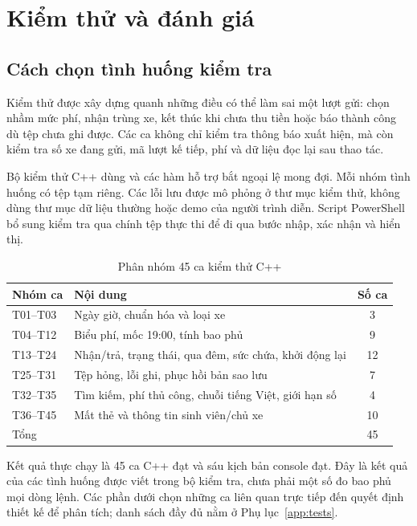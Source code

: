 \chapter{Kiểm thử và đánh giá}
\label{chap:evaluation}

\section{Cách chọn tình huống kiểm tra}
Kiểm thử được xây dựng quanh những điều có thể làm sai một lượt gửi: chọn nhầm mức phí, nhận trùng xe, kết thúc khi chưa thu tiền hoặc báo thành công dù tệp chưa ghi được. Các ca không chỉ kiểm tra thông báo xuất hiện, mà còn kiểm tra số xe đang gửi, mã lượt kế tiếp, phí và dữ liệu đọc lại sau thao tác.

Bộ kiểm thử C++ dùng  và các hàm hỗ trợ bắt ngoại lệ mong đợi. Mỗi nhóm tình huống có tệp tạm riêng. Các lỗi lưu được mô phỏng ở thư mục kiểm thử, không dùng thư mục dữ liệu thường hoặc demo của người trình diễn. Script PowerShell bổ sung kiểm tra qua chính tệp thực thi để đi qua bước nhập, xác nhận và hiển thị.

\begin{table}[H]
\centering\small
\caption{Phân nhóm 45 ca kiểm thử C++}
\label{tab:test-groups}
\begin{tabularx}{\textwidth}{l Y c}
\toprule
Nhóm ca & Nội dung & Số ca\\
\midrule
T01--T03 & Ngày giờ, chuẩn hóa và loại xe & 3\\
T04--T12 & Biểu phí, mốc 19:00, tính bao phủ & 9\\
T13--T24 & Nhận/trả, trạng thái, qua đêm, sức chứa, khởi động lại & 12\\
T25--T31 & Tệp hỏng, lỗi ghi, phục hồi bản sao lưu & 7\\
T32--T35 & Tìm kiếm, phí thủ công, chuỗi tiếng Việt, giới hạn số & 4\\
T36--T45 & Mất thẻ và thông tin sinh viên/chủ xe & 10\\
\midrule
Tổng & & 45\\
\bottomrule
\end{tabularx}
\end{table}

Kết quả thực chạy là 45 ca C++ đạt và sáu kịch bản console đạt. Đây là kết quả của các tình huống được viết trong bộ kiểm tra, chưa phải một số đo bao phủ mọi dòng lệnh. Các phần dưới chọn những ca liên quan trực tiếp đến quyết định thiết kế để phân tích; danh sách đầy đủ nằm ở Phụ lục~\ref{app:tests}.


